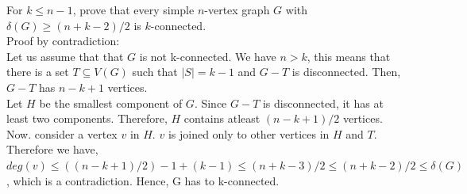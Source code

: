 \documentclass[12pt]{article}
\newenvironment{question}[2][Question]{\begin{trivlist}
\item[\hskip \labelsep {\bfseries #1}\hskip \labelsep {\bfseries #2.}]}{\end{trivlist}}
\begin{document}
\begin{question}{2}
For $k \leq n - 1$, prove that every simple $n$-vertex graph $G$ with $\delta(G) \geq (n+k-2)/2$ is $k$-connected. \\

Proof by contradiction: \\
Let us assume that that $G$ is not k-connected. We have $n > k$, this means that there is a set $T \subseteq V(G)$ such that $|S|= k-1$ and $G-T$ is disconnected. Then, $G-T$ has $n-k+1$ vertices. \\
Let $H$ be the smallest component of $G$. Since $G-T$ is disconnected, it has at least two components. Therefore, $H$ contains atleast $(n-k+1)/2$ vertices. \\
Now. consider a vertex $v$ in $H$. $v$ is joined only to other vertices in $H$ and $T$. Therefore we have, \\
$deg(v) \leq ((n-k+1)/2)-1+(k-1) \leq (n+k-3)/2 \leq (n+k-2)/2 \leq \delta(G)$, which is a contradiction.
Hence, G has to k-connected. \\

\end{question}
\end{document}
